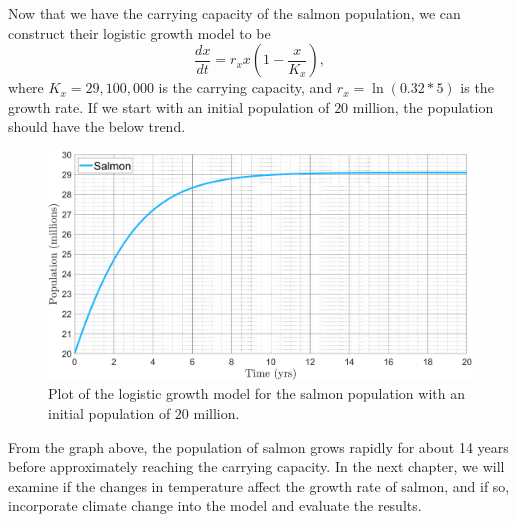 Now that we have the carrying capacity of the salmon population, we can construct their logistic growth model to be
\begin{equation}\label{eq:fishlogistic}
    \frac{dx}{dt} = r_xx\left(1-\frac{x}{K_x}\right),
\end{equation}
where $K_x=29,100,000$ is the carrying capacity, and $r_x=\ln{(0.32*5)}$ is the growth rate.
If we start with an initial population of $20$ million, the population should have the below trend.
\begin{figure}[H]
    \centering
    \includegraphics[width=14cm]{Pictures/Salmon Pop/SalmonLogistic.png}
    \caption{\singlespacing
    Plot of the logistic growth model for the salmon population with an initial population of $20$ million.}
    \label{fig:salmnologistic}
\end{figure}
From the graph above, the population of salmon grows rapidly for about 14 years before approximately reaching the carrying capacity.
In the next chapter, we will examine if the changes in temperature affect the growth rate of salmon, and if so, incorporate climate change into the model and evaluate the results.








